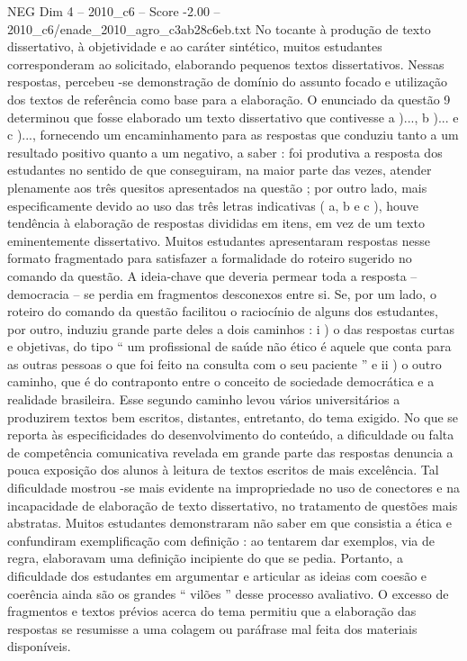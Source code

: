 \begin{textsample}{NEG Dim 4 – 2010\_c6 – Score -2.00 – 2010\_c6/enade\_2010\_agro\_c3ab28c6eb.txt}
No tocante à produção de texto dissertativo, à objetividade e ao caráter sintético, muitos estudantes corresponderam ao solicitado, elaborando pequenos textos dissertativos.
Nessas respostas, percebeu -se demonstração de domínio do assunto focado e utilização dos textos de referência como base para a elaboração.
O enunciado da questão 9 determinou que fosse elaborado um texto dissertativo que contivesse a )..., b )... e c )..., fornecendo um encaminhamento para as respostas que conduziu tanto a um resultado positivo quanto a um negativo, a saber : foi produtiva a resposta dos estudantes no sentido de que conseguiram, na maior parte das vezes, atender plenamente aos três quesitos apresentados na questão ; por outro lado, mais especificamente devido ao uso das três letras indicativas ( a, b e c ), houve tendência à elaboração de respostas divididas em itens, em vez de um texto eminentemente dissertativo.
Muitos estudantes apresentaram respostas nesse formato fragmentado para satisfazer a formalidade do roteiro sugerido no comando da questão.
A ideia-chave que deveria permear toda a resposta – democracia – se perdia em fragmentos desconexos entre si.
Se, por um lado, o roteiro do comando da questão facilitou o raciocínio de alguns dos estudantes, por outro, induziu grande parte deles a dois caminhos : i ) o das respostas curtas e objetivas, do tipo “ um profissional de saúde não ético é aquele que conta para as outras pessoas o que foi feito na consulta com o seu paciente ” e ii ) o outro caminho, que é do contraponto entre o conceito de sociedade democrática e a realidade brasileira.
Esse segundo caminho levou vários universitários a produzirem textos bem escritos, distantes, entretanto, do tema exigido.
No que se reporta às especificidades do desenvolvimento do conteúdo, a dificuldade ou falta de competência comunicativa revelada em grande parte das respostas denuncia a pouca exposição dos alunos à leitura de textos escritos de mais excelência.
Tal dificuldade mostrou -se mais evidente na impropriedade no uso de conectores e na incapacidade de elaboração de texto dissertativo, no tratamento de questões mais abstratas.
Muitos estudantes demonstraram não saber em que consistia a ética e confundiram exemplificação com definição : ao tentarem dar exemplos, via de regra, elaboravam uma definição incipiente do que se pedia.
Portanto, a dificuldade dos estudantes em argumentar e articular as ideias com coesão e coerência ainda são os grandes “ vilões ” desse processo avaliativo.
O excesso de fragmentos e textos prévios acerca do tema permitiu que a elaboração das respostas se resumisse a uma colagem ou paráfrase mal feita dos materiais disponíveis.

\end{textsample}
